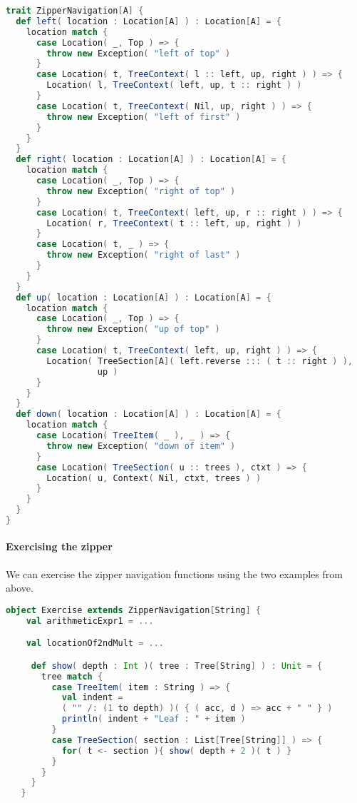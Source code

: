 \begin{lstlisting}[language=Scala,mathescape=true]
trait ZipperNavigation[A] {
  def left( location : Location[A] ) : Location[A] = {
    location match {
      case Location( _, Top ) => {
        throw new Exception( "left of top" )
      }
      case Location( t, TreeContext( l :: left, up, right ) ) => {
        Location( l, TreeContext( left, up, t :: right ) )
      }
      case Location( t, TreeContext( Nil, up, right ) ) => {
        throw new Exception( "left of first" )
      }
    }
  }
  def right( location : Location[A] ) : Location[A] = {
    location match {
      case Location( _, Top ) => {
        throw new Exception( "right of top" )
      }
      case Location( t, TreeContext( left, up, r :: right ) ) => {
        Location( r, TreeContext( t :: left, up, right ) )
      }
      case Location( t, _ ) => {
        throw new Exception( "right of last" )
      }
    }
  }
  def up( location : Location[A] ) : Location[A] = {
    location match {
      case Location( _, Top ) => {
        throw new Exception( "up of top" )
      }   
      case Location( t, TreeContext( left, up, right ) ) => {
        Location( TreeSection[A]( left.reverse ::: ( t :: right ) ),
                  up )
      }
    }
  }
  def down( location : Location[A] ) : Location[A] = {
    location match {
      case Location( TreeItem( _ ), _ ) => {
        throw new Exception( "down of item" )
      }
      case Location( TreeSection( u :: trees ), ctxt ) => {
        Location( u, Context( Nil, ctxt, trees ) )
      }
    }
  }
}
\end{lstlisting}

\paragraph{Exercising the zipper} We can exercise the zipper
navigation functions using the two examples from above.

\begin{lstlisting}[language=Scala,mathescape=true]
  object Exercise extends ZipperNavigation[String] {
    val arithmeticExpr1 = ...

    val locationOf2ndMult = ...

     def show( depth : Int )( tree : Tree[String] ) : Unit = {
       tree match {
         case TreeItem( item : String ) => {
           val indent =
           ( "" /: (1 to depth) )( { ( acc, d ) => acc + " " } )
           println( indent + "Leaf : " + item )
         }
         case TreeSection( section : List[Tree[String]] ) => {
           for( t <- section ){ show( depth + 2 )( t ) }
         }
       }
     }     
   }
\end{lstlisting}

